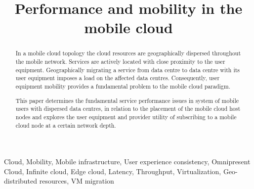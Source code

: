 \documentclass[conference]{IEEEtran}
\newcommand{\xcloud}{mobile cloud}
\newcommand{\ue}{user equipment}
\newcommand{\dc}{data centre}
\newcommand{\dcs}{data centres}
\begin{document}
\title{Performance and mobility in the \xcloud}

\author{
\and
{}
}

\maketitle

\begin{abstract}
In a \xcloud{} topology the cloud resources are geographically dispersed throughout the mobile network. Services are actively located with close proximity to the \ue. Geographically migrating a service from \dc{} to \dc{} with its \ue{} imposes a load on the affected \dcs. Consequently, \ue{} mobility provides a fundamental problem to the \xcloud{} paradigm.

This paper determines the fundamental service performance issues in system of mobile users with dispersed \dcs{}, in relation to the placement of the \xcloud{} host nodes and explores the \ue{} and provider utility of subscribing to a \xcloud{} node at a certain network depth.

\end{abstract}

\begin{keywords} 
Cloud, Mobility, Mobile infrastructure, User experience consistency, Omnipresent Cloud, Infinite cloud, Edge cloud, Latency, Throughput, Virtualization, Geo-distributed resources, VM migration
\end{keywords} 

\IEEEpeerreviewmaketitle






\end{document}
